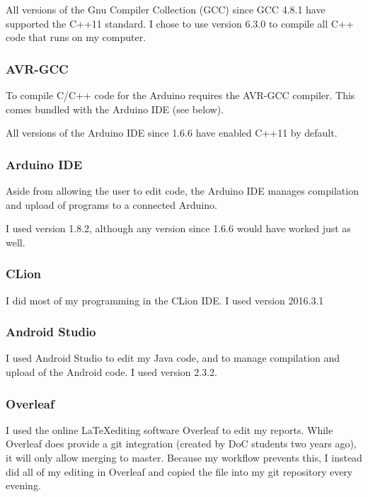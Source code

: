 \documentclass[a4paper]{article}
\begin{document}
All versions of the Gnu Compiler Collection (GCC) since GCC 4.8.1 have supported the C++11 standard\cite{ppref16}. I chose to use version 6.3.0\cite{ppref17} to compile all C++ code that runs on my computer.

\subsubsection{AVR-GCC}

To compile C/C++ code for the Arduino requires the AVR-GCC compiler. This comes bundled with the Arduino IDE\cite{ppref18} (see below).

All versions of the Arduino IDE since 1.6.6 have enabled C++11 by default.

\subsubsection{Arduino IDE}

Aside from allowing the user to edit code, the Arduino IDE\cite{ppref18} manages compilation and upload of programs to a connected Arduino.

I used version 1.8.2, although any version since 1.6.6 would have worked just as well.

\subsubsection{CLion}

I did most of my programming in the CLion\cite{ppref19} IDE. I used version 2016.3.1 

\subsubsection{Android Studio}

I used Android Studio\cite{ppref20} to edit my Java code, and to manage compilation and upload of the Android code. I used version 2.3.2.

\subsubsection{Overleaf}%
\label{subsubsec:pp_ts_overleaf}

I used the online \LaTeX editing software Overleaf\cite{ppref21} to edit my reports. While Overleaf does provide a git integration (created by DoC students two years ago), it will only allow merging to master. Because my workflow prevents this, I instead did all of my editing in Overleaf and copied the file into my git repository every evening.
\end{document}
